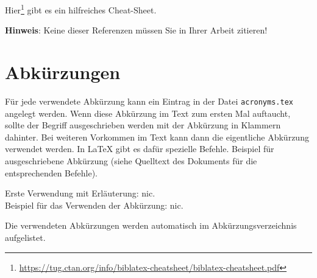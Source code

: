 Hier\footnote{\url{https://tug.ctan.org/info/biblatex-cheatsheet/biblatex-cheatsheet.pdf}} gibt es ein hilfreiches Cheat-Sheet.


\textbf{Hinweis}: Keine dieser Referenzen müssen Sie in Ihrer Arbeit zitieren!

\section{Abkürzungen}
Für jede verwendete Abkürzung kann ein Eintrag in der Datei \texttt{acronyms.tex} angelegt werden. Wenn diese Abkürzung im Text zum ersten Mal auftaucht, sollte der Begriff ausgeschrieben werden mit der Abkürzung in Klammern dahinter. Bei weiteren Vorkommen im Text kann dann die eigentliche Abkürzung verwendet werden. In \LaTeX{} gibt es dafür spezielle Befehle. Beispiel für ausgeschriebene Abkürzung (siehe Quelltext des Dokuments für die entsprechenden Befehle).

Erste Verwendung mit Erläuterung: \acrfull{nic}.\\ 
Beispiel für das Verwenden der Abkürzung: \acrshort{nic}. 

Die verwendeten Abkürzungen werden automatisch im Abkürzungsverzeichnis aufgelistet.


